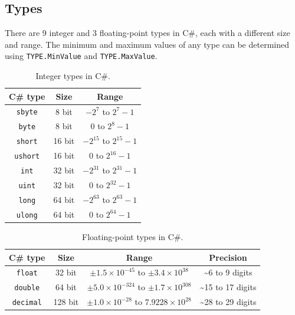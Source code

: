 \documentclass{article}
\begin{document}
\subsection{Types}
There are 9 integer and 3 floating-point types in C\#, each with a different size and range. The minimum and maximum
values of any type can be determined using \lstinline!TYPE.MinValue! and \linebreak \lstinline!TYPE.MaxValue!.
\begin{table}[H]
    \centering
    \begin{tabular}{c c c}
        \toprule
        \textbf{C\# type}  & \textbf{Size} & \textbf{Range}                \\
        \midrule
        \lstinline!sbyte!  & 8 bit         & \(-2^7\) to \(2^7 - 1\)       \\
        \lstinline!byte!   & 8 bit         & \(0\) to \(2^8 - 1\)          \\
        \lstinline!short!  & 16 bit        & \(-2^{15}\) to \(2^{15} - 1\) \\
        \lstinline!ushort! & 16 bit        & \(0\) to \(2^{16} - 1\)       \\
        \lstinline!int!    & 32 bit        & \(-2^{31}\) to \(2^{31} - 1\) \\
        \lstinline!uint!   & 32 bit        & \(0\) to \(2^{32} - 1\)       \\
        \lstinline!long!   & 64 bit        & \(-2^{63}\) to \(2^{63} - 1\) \\
        \lstinline!ulong!  & 64 bit        & \(0\) to \(2^{64} - 1\)       \\
        \bottomrule
    \end{tabular}
    \caption{Integer types in C\#.}
\end{table}
\begin{table}[H]
    \centering
    \begin{tabular}{c c c c}
        \toprule
        \textbf{C\# type}   & \textbf{Size} & \textbf{Range}                                              & \textbf{Precision}   \\
        \midrule
        \lstinline!float!   & 32 bit        & \(\pm 1.5 \times 10^{-45}\) to \(\pm 3.4 \times 10^{38}\)   & \sim 6 to 9 digits   \\
        \lstinline!double!  & 64 bit        & \(\pm 5.0 \times 10^{-324}\) to \(\pm 1.7 \times 10^{308}\) & \sim 15 to 17 digits \\
        \lstinline!decimal! & 128 bit       & \(\pm 1.0 \times 10^{-28}\) to \(7.9228 \times 10^{28}\)    & \sim 28 to 29 digits \\
        \bottomrule
    \end{tabular}
    \caption{Floating-point types in C\#.}
\end{table}
\end{document}
